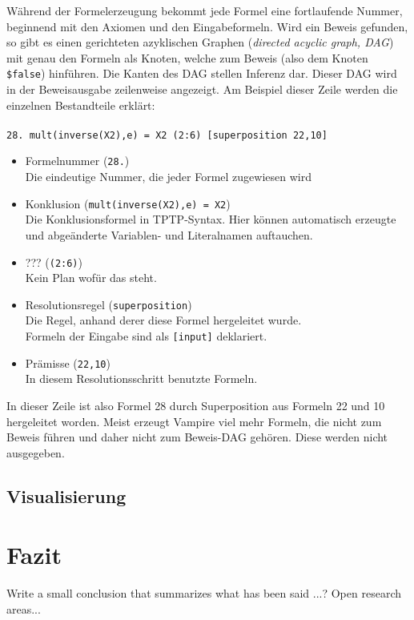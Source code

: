 \documentclass{article}
\begin{document}
Während der Formelerzeugung bekommt jede Formel eine fortlaufende Nummer, beginnend mit den Axiomen und den Eingabeformeln. Wird ein Beweis gefunden, so gibt es einen gerichteten azyklischen Graphen (\textit{directed acyclic graph, DAG}) mit genau den Formeln als Knoten, welche zum Beweis (also dem Knoten \texttt{\$false}) hinführen. Die Kanten des DAG stellen Inferenz dar. Dieser DAG wird in der Beweisausgabe zeilenweise angezeigt. 
Am Beispiel dieser Zeile werden die einzelnen Bestandteile erklärt:\\ \\
\texttt{28. mult(inverse(X2),e) = X2 (2:6) [superposition 22,10]}
\begin{itemize}
	\item Formelnummer (\texttt{28.})\\
		Die eindeutige Nummer, die jeder Formel zugewiesen wird
	\item Konklusion (\texttt{mult(inverse(X2),e) = X2})\\
		Die Konklusionsformel in TPTP-Syntax. Hier können automatisch erzeugte und abgeänderte
		Variablen- und Literalnamen auftauchen.
	\item ??? (\texttt{(2:6)})\\
		Kein Plan wofür das steht.
	\item Resolutionsregel (\texttt{superposition})\\
		Die Regel, anhand derer diese Formel hergeleitet wurde.\\
		Formeln der Eingabe sind als \texttt{[input]} deklariert.
	\item Prämisse (\texttt{22,10})\\
		In diesem Resolutionsschritt benutzte Formeln.
		
	
\end{itemize}
In dieser Zeile ist also Formel 28 durch Superposition aus Formeln 22 und 10 hergeleitet worden.
Meist erzeugt Vampire viel mehr Formeln, die nicht zum Beweis führen und daher nicht zum Beweis-DAG gehören. Diese werden nicht ausgegeben.

\subsection{Visualisierung}
\label{subsec:outputvis}

\section{Fazit}
\label{sec:conclusion}
Write a small conclusion that summarizes what has been said ...?
Open research areas...





\end{document}
